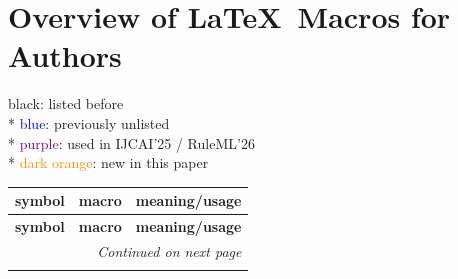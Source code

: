 \onecolumn
\section*{Overview of \LaTeX~Macros for Authors}

\noindent
black: listed before\\*
\textcolor{blue}{blue}: previously unlisted\\*
\textcolor{purple}{purple}: used in IJCAI'25 / RuleML'26\\*
\textcolor{darkorange}{dark orange}: new in this paper
\par\medskip

\bgroup
\renewcommand{\arraystretch}{1.4}
\begin{longtable}{lp{}p{}}
    \textbf{symbol} & \textbf{macro} & \textbf{meaning/usage} \\
    \endfirsthead

    \textbf{symbol} & \textbf{macro} & \textbf{meaning/usage} \\
    \hline
    \endhead

    \hline
    \multicolumn{3}{r}{\textit{Continued on next page}}       \\
    \hline
    \endfoot


\end{longtable}
